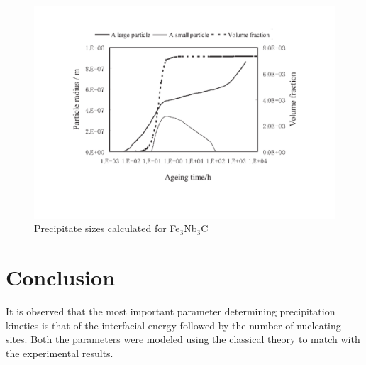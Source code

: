 \documentclass[12pt]{article}
\begin{document}
\begin{figure}
\centering
\includegraphics[width=14cm]{size.pdf}
\caption{Precipitate sizes calculated for Fe$_3$Nb$_3$C}
\label{fig:size}
\end{figure}
\section{Conclusion}

It is observed that the most important parameter determining precipitation kinetics is that of the interfacial energy followed by the number of nucleating sites. Both the parameters were modeled using the classical theory to match with the experimental results. 
\end{document}
